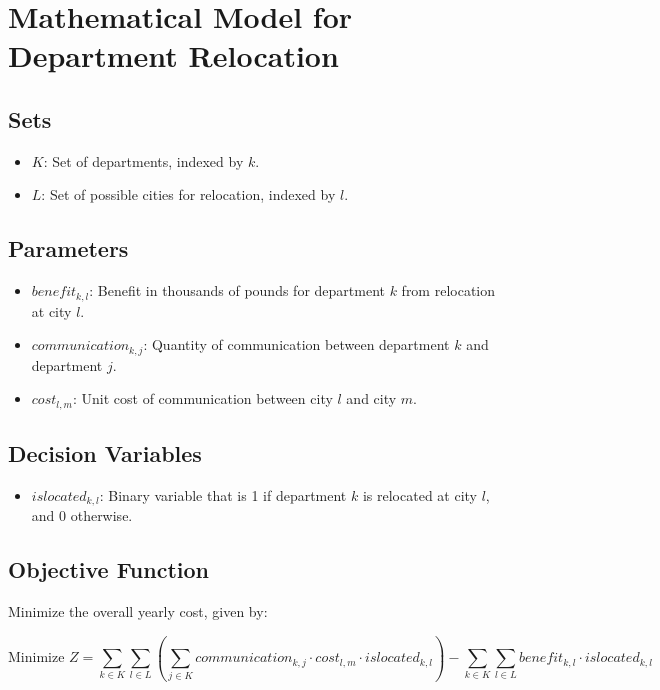 \documentclass{article}
\begin{document}
\section*{Mathematical Model for Department Relocation}

\subsection*{Sets}
\begin{itemize}
    \item $K$: Set of departments, indexed by $k$.
    \item $L$: Set of possible cities for relocation, indexed by $l$.
\end{itemize}

\subsection*{Parameters}
\begin{itemize}
    \item $benefit_{k,l}$: Benefit in thousands of pounds for department $k$ from relocation at city $l$.
    \item $communication_{k,j}$: Quantity of communication between department $k$ and department $j$.
    \item $cost_{l,m}$: Unit cost of communication between city $l$ and city $m$.
\end{itemize}

\subsection*{Decision Variables}
\begin{itemize}
    \item $islocated_{k,l}$: Binary variable that is 1 if department $k$ is relocated at city $l$, and 0 otherwise.
\end{itemize}

\subsection*{Objective Function}
Minimize the overall yearly cost, given by:

\[
\text{Minimize } Z = \sum_{k \in K} \sum_{l \in L} \left( \sum_{j \in K} communication_{k,j} \cdot cost_{l,m} \cdot islocated_{k,l} \right) - \sum_{k \in K} \sum_{l \in L} benefit_{k,l} \cdot islocated_{k,l}
\]
\end{document}
